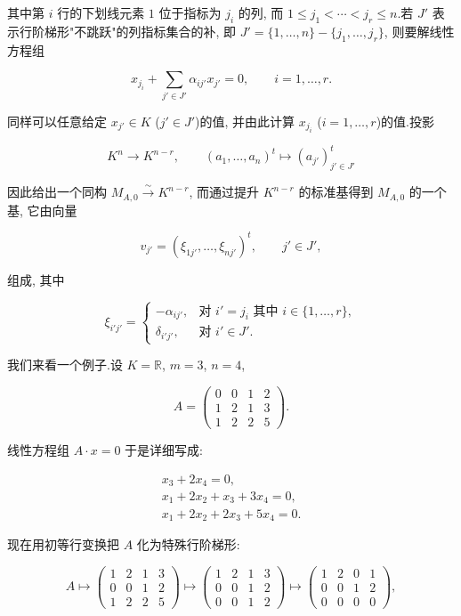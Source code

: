 其中第 $i$ 行的下划线元素 $1$ 位于指标为 $j_i$ 的列, 而 $1 \leq j_1 < \cdots < j_r \leq n$.若 $J'$ 表示行阶梯形"不跳跃"的列指标集合的补, 即 $J' = \{1, \ldots, n\} - \{j_1, \ldots, j_r\}$, 则要解线性方程组

\[
x_{j_i} + \sum_{j' \in J'}\alpha_{ij'}x_{j'} = 0, \qquad i = 1, \ldots, r\text{.}
\]

同样可以任意给定 $x_{j'} \in K$ ($j' \in J'$)的值, 并由此计算 $x_{j_i}$ ($i = 1, \ldots, r$)的值.投影

\[
K^n \longrightarrow K^{n - r}, \qquad (a_1, \ldots, a_n)^t \longmapsto (a_{j'})_{j' \in J'}^t
\]

因此给出一个同构 $M_{A, 0} \overset{\sim}{\longrightarrow} K^{n - r}$, 而通过提升 $K^{n - r}$ 的标准基得到 $M_{A, 0}$ 的一个基, 它由向量

\[
v_{j'} = (\xi_{1j'}, \ldots, \xi_{nj'})^t, \qquad j' \in J',
\]

组成, 其中

\[
\xi_{i'j'} = \begin{cases}
-\alpha_{ij'}, & \text{对 } i' = j_i \text{ 其中 } i \in \{1, \ldots, r\}, \\
\delta_{i'j'}, & \text{对 } i' \in J'\text{.}
\end{cases}
\]

我们来看一个例子.设 $K = \mathbb{R}$, $m = 3$, $n = 4$,

\[
A = \begin{pmatrix} 0 & 0 & 1 & 2 \\ 1 & 2 & 1 & 3 \\ 1 & 2 & 2 & 5 \end{pmatrix}\text{.}
\]

线性方程组 $A \cdot x = 0$ 于是详细写成:

\[
\begin{array}{r}
x_3 + 2x_4 = 0, \\
x_1 + 2x_2 + x_3 + 3x_4 = 0, \\
x_1 + 2x_2 + 2x_3 + 5x_4 = 0\text{.}
\end{array}
\]

现在用初等行变换把 $A$ 化为特殊行阶梯形:

\[
A \longmapsto \begin{pmatrix} 1 & 2 & 1 & 3 \\ 0 & 0 & 1 & 2 \\ 1 & 2 & 2 & 5 \end{pmatrix}
\longmapsto \begin{pmatrix} 1 & 2 & 1 & 3 \\ 0 & 0 & 1 & 2 \\ 0 & 0 & 1 & 2 \end{pmatrix}
\longmapsto \begin{pmatrix} 1 & 2 & 0 & 1 \\ 0 & 0 & 1 & 2 \\ 0 & 0 & 0 & 0 \end{pmatrix},
\]

